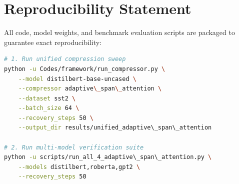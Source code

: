 \section{Reproducibility Statement}
All code, model weights, and benchmark evaluation scripts are packaged to guarantee exact reproducibility:
\begin{lstlisting}[language=bash]
# 1. Run unified compression sweep
python -u Codes/framework/run_compressor.py \
    --model distilbert-base-uncased \
    --compressor adaptive\_span\_attention \
    --dataset sst2 \
    --batch_size 64 \
    --recovery_steps 50 \
    --output_dir results/unified_adaptive\_span\_attention

# 2. Run multi-model verification suite
python -u scripts/run_all_4_adaptive\_span\_attention.py \
    --models distilbert,roberta,gpt2 \
    --recovery_steps 50
\end{lstlisting}
